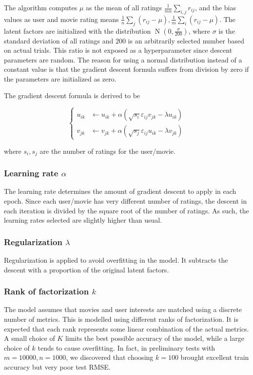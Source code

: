 \documentclass[final]{cvpr}
\newcommand{\Par}[1]{\left(#1\right)}
\begin{document}
The algorithm computes $\mu$ as the mean of all ratings $\frac1{mn} \sum_{i,j} r_{ij}$,
and the bias values as user and movie rating means
$\frac1n \sum_j (r_{ij} - \mu), \frac1m \sum_i (r_{ij} - \mu)$.
The latent factors are initialized with the distribution $\operatorname N(0, \frac\sigma{200})$,
where $\sigma$ is the standard deviation of all ratings
and $200$ is an arbitrarily selected number based on actual trials.
This ratio is not exposed as a hyperparameter since descent parameters are random.
The reason for using a normal distribution instead of a constant value is that
the gradient descent formula suffers from division by zero
if the parameters are initialized as zero.

The gradient descent formula is derived to be

$$ \begin{cases}
	u_{ik} &\leftarrow u_{ik} + \alpha \Par{ \sqrt{s_i} \varepsilon_{ij} v_{jk} - \lambda u_{ik} } \\
	v_{jk} &\leftarrow v_{jk} + \alpha \Par{ \sqrt{s_j} \varepsilon_{ij} u_{ik} - \lambda v_{jk} }
\end{cases} $$

where $s_i, s_j$ are the number of ratings for the user/movie.

\subsubsection{Learning rate $\alpha$}
The learning rate determines the amount of gradient descent to apply in each epoch.
Since each user/movie has very different number of ratings, the descent in each iteration
is divided by the square root of the number of ratings.
As such, the learning rates selected are slightly higher than usual.

\subsubsection{Regularization $\lambda$}
Regularization is applied to avoid overfitting in the model.
It subtracts the descent with a proportion of the original latent factors.

\subsubsection{Rank of factorization $k$}
The model assumes that movies and user interests are matched using a discrete number of metrics.
This is modelled using different ranks of factorization.
It is expected that each rank represents some linear combination of the actual metrics.
A small choice of $K$ limits the best possible accuracy of the model,
while a large choice of $k$ tends to cause overfitting.
In fact, in preliminary tests with $m=10000, n=1000$,
we discovered that choosing $k=100$ brought excellent train accuracy but very poor test RMSE.
\end{document}
